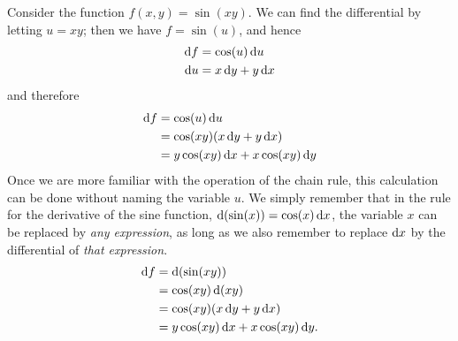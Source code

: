 \begin{eg}
  Consider the function $f(x,y) = \sin (xy)$.
  We can find the differential by letting $u=xy$; then we have $f = \sin(u)$, and hence
  \begin{align*}
    {\ensuremath{\mathrm{d} f}} &= \cos(u)\,{\mathrm{d} u}\\
    {\mathrm{d} u} &= x\,{\mathrm{d} y} + y\,{\mathrm{d} x}
  \end{align*}
  and therefore
  \begin{align*}
    {\ensuremath{\mathrm{d} f}} &= \cos(u)\,{\mathrm{d} u} \\
    &= \cos(xy) (x\,{\mathrm{d} y} + y\,{\mathrm{d} x})\\
    &= y\cos(xy)\,{\mathrm{d} x} + x\cos(xy)\,{\mathrm{d} y}
  \end{align*}
  Once we are more familiar with the operation of the chain rule, this calculation can be done without naming the variable $u$.
  We simply remember that in the rule for the derivative of the sine function, $\mathrm{d}(\sin(x)) = \cos(x) \, {\mathrm{d} x}$, the variable $x$ can be replaced by \emph{any expression}, as long as we also remember to replace ${\mathrm{d} x}$ by the differential of \emph{that expression}.
  \begin{align*}
    {\ensuremath{\mathrm{d} f}} &= \mathrm{d}(\sin(xy))\\
    &= \cos(xy) \, \mathrm{d}(xy)\\
    &= \cos(xy) (x\,{\mathrm{d} y} + y\,{\mathrm{d} x})\\
    &= y\cos(xy)\,{\mathrm{d} x} + x\cos(xy)\,{\mathrm{d} y}.
  \end{align*}
\end{eg}

